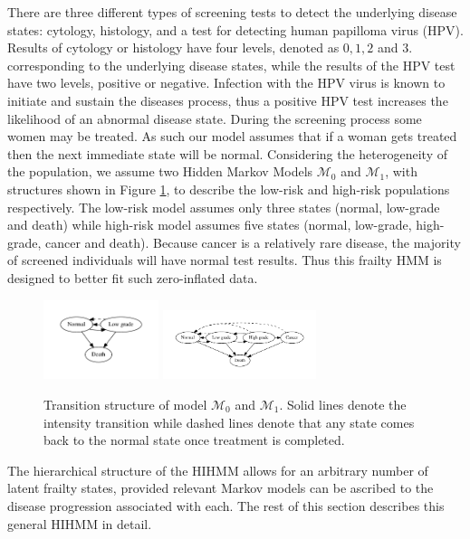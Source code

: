 \documentclass{article}
\begin{document}
There are three different types of screening tests to detect the underlying disease states: cytology, histology, and a test for detecting human papilloma virus (HPV). Results of cytology or histology have four levels, denoted as $0, 1, 2$ and $3$. corresponding to the underlying disease states, while the results of the HPV test have two levels, positive or negative. Infection with the HPV virus is known to initiate and sustain the diseases process, thus a positive HPV test increases the likelihood of an abnormal disease state.
During the screening process some women may be treated. As such our model assumes that if a woman gets treated then the next immediate state will be normal. Considering the heterogeneity of the population, we assume two Hidden Markov Models $\mathcal{M}_0$ and $\mathcal{M}_1$, with structures shown in Figure \ref{Models}, to describe the low-risk and high-risk populations respectively. The low-risk model assumes only three states (normal, low-grade and death) while high-risk model assumes five states (normal, low-grade, high-grade, cancer and death).  Because cancer is a relatively rare disease, the majority of screened individuals will have normal test results.  Thus this frailty HMM is designed to better fit such zero-inflated data. 

\begin{figure}[ht!]
	\centering
	\includegraphics[width = 0.3\textwidth]{pic/M0}
	\includegraphics[width = 0.4\textwidth]{pic/M1}
	\caption{Transition structure of model $\mathcal{M}_0$ and $\mathcal{M}_1$. Solid lines denote the intensity transition while dashed lines denote that any state comes back to the normal state once treatment is completed.}
	\label{Models}
\end{figure}

The hierarchical structure of the HIHMM allows for an arbitrary number of latent frailty states, provided relevant Markov models can be ascribed to the disease progression associated with each.  The rest of this section describes this general HIHMM in detail.  
\end{document}
